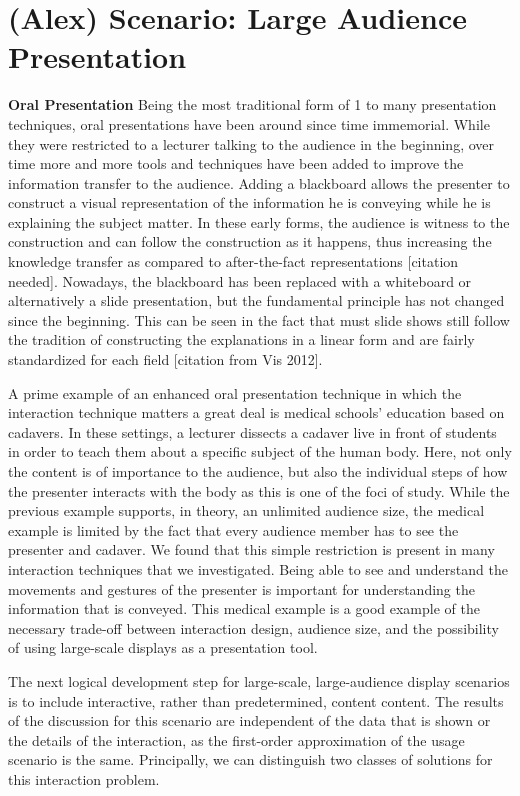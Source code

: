 \documentclass[review,journal]{vgtc}         %
\begin{document}
\section{(Alex) Scenario: Large Audience Presentation}

\noindent \textbf{Oral Presentation} Being the most traditional form of 1 to many presentation techniques, oral presentations have been around since time immemorial.
While they were restricted to a lecturer talking to the audience in the beginning, over time more and more tools and techniques have been added to improve the information transfer to the audience.
Adding a blackboard allows the presenter to construct a visual representation of the information he is conveying while he is explaining the subject matter.
In these early forms, the audience is witness to the construction and can follow the construction as it happens, thus increasing the knowledge transfer as compared to after-the-fact representations [citation needed].
Nowadays, the blackboard has been replaced with a whiteboard or alternatively a slide presentation, but the fundamental principle has not changed since the beginning.
This can be seen in the fact that must slide shows still follow the tradition of constructing the explanations in a linear form and are fairly standardized for each field [citation from Vis 2012].

A prime example of an enhanced oral presentation technique in which the interaction technique matters a great deal is medical schools' education based on cadavers.
In these settings, a lecturer dissects a cadaver live in front of students in order to teach them about a specific subject of the human body.
Here, not only the content is of importance to the audience, but also the individual steps of how the presenter interacts with the body as this is one of the foci of study.
While the previous example supports, in theory, an unlimited audience size, the medical example is limited by the fact that every audience member has to see the presenter and cadaver.
We found that this simple restriction is present in many interaction techniques that we investigated.
Being able to see and understand the movements and gestures of the presenter is important for understanding the information that is conveyed.
This medical example is a good example of the necessary trade-off between interaction design, audience size, and the possibility of using large-scale displays as a presentation tool.

The next logical development step for large-scale, large-audience display scenarios is to include interactive, rather than predetermined, content content.
The results of the discussion for this scenario are independent of the data that is shown or the details of the interaction, as the first-order approximation of the usage scenario is the same.
Principally, we can distinguish two classes of solutions for this interaction problem.
\end{document}
